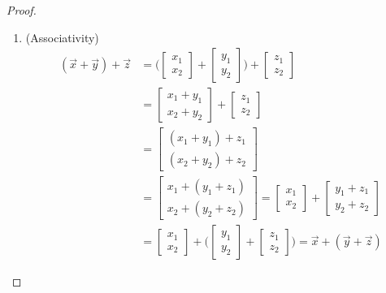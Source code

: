 \begin{proof}
\begin{enumerate}
\item (Associativity)
\begin{align*}
 (\vec{x} + \vec{y}) + \vec{z} & = 
\biggl( \begin{bmatrix}
 x_1 \\ x_2
 \end{bmatrix} + \begin{bmatrix}
 y_1 \\ y_2 
 \end{bmatrix} \biggr) + \begin{bmatrix}
 z_1 \\ z_2
 \end{bmatrix} \\
 & = 
\begin{bmatrix}
 x_1 + y_1 \\
 x_2 + y_2 
\end{bmatrix} + \begin{bmatrix}
z_1 \\ z_2 
\end{bmatrix} \\
& = 
\begin{bmatrix}
 (x_1 + y_1) + z_1 \\
 (x_2 + y_2) + z_2 
\end{bmatrix} \\
& =
\begin{bmatrix}
 x_1 + (y_1 + z_1) \\
 x_2 + (y_2 + z_2)
\end{bmatrix} 
= \begin{bmatrix}
x_1 \\ x_2
\end{bmatrix}+ 
\begin{bmatrix}
 y_1 + z_1 \\
 y_2 + z_2 
\end{bmatrix}\\
 &  = \begin{bmatrix}
x_1 \\ x_2 
\end{bmatrix} + \biggl( \begin{bmatrix}
y_1 \\ y_2 
\end{bmatrix} + \begin{bmatrix}
z_1 \\ z_2 
\end{bmatrix} \biggr) = \vec{x} + (\vec{y} + \vec{z}) 
\end{align*}


\end{enumerate}
\end{proof}
